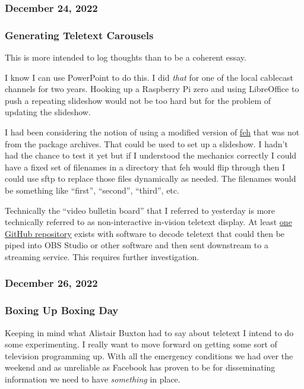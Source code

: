 \subsubsection{December 24, 2022}\label{december-24-2022}

\subsubsection{Generating Teletext
Carousels}\label{generating-teletext-carousels}

This is more intended to log thoughts than to be a coherent essay.

I know I can use PowerPoint to do this. I did \emph{that} for one of the
local cablecast channels for two years. Hooking up a Raspberry Pi zero
and using LibreOffice to push a repeating slideshow would not be too
hard but for the problem of updating the slideshow.

I had been considering the notion of using a modified version of
\href{http://web.archive.org/web/20221222032104/https://feh.finalrewind.org/}{feh}
that was not from the package archives. That could be used to set up a
slideshow. I hadn't had the chance to test it yet but if I understood
the mechanics correctly I could have a fixed set of filenames in a
directory that feh would flip through then I could use sftp to replace
those files dynamically as needed. The filenames would be something like
``first'', ``second'', ``third'', etc.

Technically the ``video bulletin board'' that I referred to yesterday is
more technically referred to as non-interactive in-vision teletext
display. At least \href{https://github.com/peterkvt80/vbit-iv}{one
GitHub repository} exists with software to decode teletext that could
then be piped into OBS Studio or other software and then sent downstream
to a streaming service. This requires further investigation.

\subsubsection{December 26, 2022}\label{december-26-2022}

\subsubsection{Boxing Up Boxing Day}\label{boxing-up-boxing-day}

Keeping in mind what Alistair Buxton had to say about teletext I intend
to do some experimenting. I really want to move forward on getting some
sort of television programming up. With all the emergency conditions we
had over the weekend and as unreliable as Facebook has proven to be for
disseminating information we need to have \emph{something} in place.

